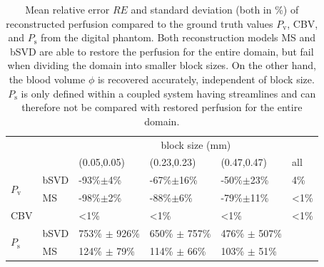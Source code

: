 \documentclass[journal,twocolumn]{IEEEtran}
\newcommand{\Perfv}{P_{\mathrm{v}}}
\newcommand{\Perfs}{P_{\mathrm{s}}}
\begin{document}
	\begin{table}[h!tb]
		\scriptsize
		\caption{Mean relative error $RE$ and standard deviation (both in \%) of reconstructed perfusion compared to the ground truth values $\Perfv$, CBV, and $\Perfs$ from the digital phantom. Both reconstruction models MS and bSVD are able to restore the perfusion for the entire domain, but fail when dividing the domain into smaller block sizes. On the other hand, the blood volume $\phi$ is recovered accurately, independent of block size. $\Perfs$ is only defined within a coupled system having streamlines and can therefore not be compared with restored perfusion for the entire domain.
		} 
		\centering
		\begin{tabular}{p{.3cm} l l l l l}
			& & \multicolumn{4}{c}{block size (\si{\mm})} \\
										& 		& (0.05,0.05) 		& (0.23,0.23) 	& 	(0.47,0.47)			& all \\ \toprule
			\multirow{2}{*}{$\Perfv$}	& bSVD 	& -93\%$\pm$4\% 	& -67\%$\pm$16\%	& -50\%$\pm$23\%	& 4\% 	\\ 
									   	& MS 	& -98\%$\pm$2\% 	& -88\%$\pm$6\%		& -79\%$\pm$11\%	& <1\% 	\\ \midrule
									CBV & 		& <1\% 				& <1\% 				& <1\% 				& <1\% 	\\ \midrule
			\multirow{2}{*}{$\Perfs$}	& bSVD	& 753\% $\pm$ 926\%	& 650\% $\pm$ 757\%	& 476\% $\pm$ 507\% & 		\\
										& MS 	& 124\% $\pm$ 79\%  & 114\% $\pm$ 66\%	& 103\% $\pm$ 51\% 	& 		\\
		\end{tabular}

		\label{tab:resultsSim}
	\end{table}
\end{document}
